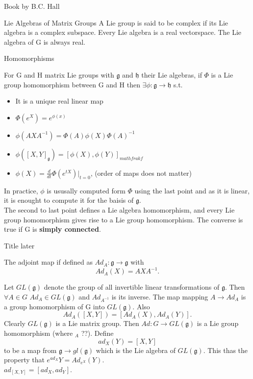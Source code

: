 \documentclass[12pt, letterpaper]{article}
\begin{document}
\begin{section}{Book by B.C. Hall}
\begin{subsection}{Lie Algebras of Matrix Groups}
    A Lie group is said to be complex if its Lie algebra is a complex subspace.
    Every Lie algebra is a real vectorspace. The Lie algebra of G is always
    real.

    \begin{subsubsection}{Homomorphisms}

      For G and H matrix Lie groups with \(\mathfrak{g}\) and \(\mathfrak{h}\)
      their Lie algebras, if \(\Phi\) is a Lie group homomorphism between G and
      H then \(\exists \phi: \mathfrak{g} \to \mathfrak{h}\) s.t.\
      \begin{itemize}
        \item It is a unique real linear map
        \item \(\Phi(e^{X}) = e^{\phi(x)}\)
        \item \(\phi(AXA^{-1}) = \Phi(A) \phi(X) \Phi(A)^{-1}\)
        \item \(\phi([X, Y]_{\mathfrak{g}}) = [\phi(X), \phi(Y)]_{mathfrak{f}}\)
        \item \(\phi(X) = \frac{d}{dt} \Phi(e^{tX})|_{t=0}\), (order of maps
              does not matter)
      \end{itemize}
      In practice, \(\phi\) is ususally computed form \(\Phi\) using the last
      point and as it is linear, it is enought to compute it for the baisis of
      \(\mathfrak{g}\). \\
      The second to last point defines a Lie algebra homomorphism, and every Lie
      group homomorphism gives rise to a Lie group homomorphism. The converse is
      true if G is \textbf{simply connected}.

    \end{subsubsection}

    \begin{subsubsection}{Title later}

      The adjoint map if defined as \(Ad_{A}: \mathfrak{g} \to \mathfrak{g}\)
      with \[Ad_{A}(X) = AXA^{-1}.\]

      Let \(GL(\mathfrak{g})\) denote the group of all invertible linear
      transformations of \(\mathfrak{g}\). Then \(\forall A \in G\)
      \(Ad_{A} \in GL(\mathfrak{g})\) and \(Ad_{A^{-1}}\) is its inverse. The
      map mapping \(A \to Ad_{A}\) is a group homomorphism of G into
      \(GL(\mathfrak{g})\). Also \[Ad_{A}([X, Y]) = [Ad_{A}(X), Ad_{A}(Y)].\]
      Clearly \(GL(\mathfrak{g})\) is a Lie matrix group. Then
      \(Ad: G \to GL(\mathfrak{g})\) is a Lie group homomorphism (where \(_{A}\)
      ??). Define \[ad_{X}(Y) = [X, Y]\] to be a map from
      \(\mathfrak{g} \to gl(\mathfrak{g})\) which is the Lie algebra of
      \(GL(\mathfrak{g})\). This thas the property that \(e^{ad_{X}}Y =
      Ad_{e^{X}}(Y)\). \\
      \(ad_{[X, Y]} = [ad_{X}, ad_{Y}]\).


\end{subsubsection}
\end{subsection}
\end{section}
\end{document}
